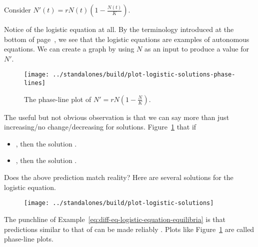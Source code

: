 \documentclass[../main.tex]{subfiles}
\begin{document}
\begin{example} \label{eq:diff-eq-logistic-equation-equilibria}
  Consider \(N'(t) = rN(t) \left( 1 - \frac{N(t)}{K} \right)\).

  Notice  of the logistic equation at all. By the terminology introduced at the bottom of page~\pageref{def:autonomous}, we see that the logistic equations are examples of autonomous equations. We can create a graph by using \(N\) as an input to produce a value for \(N'\).

  \begin{figure}[H] %
    \centering
    \texttt{[image: ../standalones/build/plot-logistic-solutions-phase-lines]}
    \caption{The phase-line plot of \(N' = rN \left( 1 - \frac{N}{K} \right)\).}
    \label{fig:logistic-solutions-phase-lines}
  \end{figure}

  \faStar{} The useful but not obvious observation is that we can say more than just increasing/no change/decreasing for solutions. Figure~\ref{fig:logistic-solutions-phase-lines}  that if \underline{\hspace{2in}}
  \begin{itemize}
    \item \underline{\hspace{2in}}, then the solution \underline{\hspace{3in}}.
    \item \underline{\hspace{2in}}, then the solution \underline{\hspace{3in}}.
  \end{itemize}

  Does the above prediction match reality? Here are several solutions for the logistic equation.
  \begin{figure}[H] %
    \centering
    \texttt{[image: ../standalones/build/plot-logistic-solutions]}
    \label{fig:logistic-solutions}
  \end{figure}

\end{example}

The punchline of Example~\ref{eq:diff-eq-logistic-equation-equilibria} is that predictions similar to that of \faStar{} can be made reliably .  Plots like Figure~\ref{fig:logistic-solutions-phase-lines} are called phase-line plots. 
\end{document}
